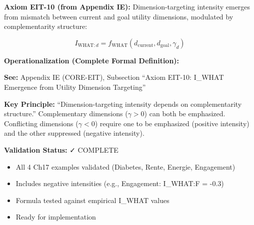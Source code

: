 \begin{tcolorbox}[colback=green!5!white, colframe=green!75!black,
    title=\textbf{EIT-10: I_WHAT Emergence (FORMALIZED)}]

\textbf{Axiom EIT-10 (from Appendix IE):} Dimension-targeting intensity emerges from mismatch between current and goal utility dimensions, modulated by complementarity structure:

\begin{equation}
I_{\text{WHAT}:d} = f_{\text{WHAT}}(d_{\text{current}}, d_{\text{goal}}, \gamma_d)
\end{equation}

\textbf{Operationalization (Complete Formal Definition):}

\textbf{See:} Appendix IE (CORE-EIT), Subsection ``Axiom EIT-10: I_WHAT Emergence from Utility Dimension Targeting''

\textbf{Key Principle:} ``Dimension-targeting intensity depends on complementarity structure.'' Complementary dimensions ($\gamma > 0$) can both be emphasized. Conflicting dimensions ($\gamma < 0$) require one to be emphasized (positive intensity) and the other suppressed (negative intensity).

\textbf{Validation Status:} ✓ COMPLETE
\begin{itemize}[nosep]
\item All 4 Ch17 examples validated (Diabetes, Rente, Energie, Engagement)
\item Includes negative intensities (e.g., Engagement: I_WHAT:F = -0.3)
\item Formula tested against empirical I_WHAT values
\item Ready for implementation
\end{itemize}

\end{tcolorbox}

